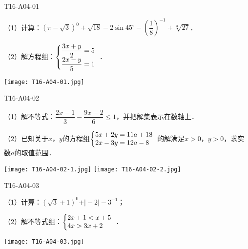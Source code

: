 
\begin{defproblem}{T16-A04-01}%
\begin{onlyproblem}%
（1）计算：$(\pi -\sqrt 3 )^0+\sqrt {18} -2\sin 45^{\circ}-\left(\dfrac{1}{8}\right)^{-1}+\sqrt[3]{27}$．

\renewcommand{\arraystretch}{1.38}
（2）解方程组：$\left\{\begin{array}{@{}l}
 \dfrac{3x+y}{2}=5 \\ 
 \dfrac{2x-y}{5}=1 \\ 
 \end{array}\right.$．
\end{onlyproblem}%
\begin{onlysolution}%
\begin{center}
\texttt{[image: T16-A04-01.jpg]}
\end{center}
\end{onlysolution}%
\end{defproblem}


\begin{defproblem}{T16-A04-02}%
\begin{onlyproblem}%

（1）解不等式：$\dfrac{2x-1}{3}-\dfrac{9x-2}{6}\le 1$，并把解集表示在数轴上．


（2）已知关于$x$，$y$的方程组$\left\{\begin{array}{@{}l}
 5x+2y=11a+18 \\ 
 2x-3y=12a-8 \\ 
 \end{array}\right.$的解满足$x>0$，$y>0$，求实数$a$的取值范围．

\end{onlyproblem}%
\begin{onlysolution}%
\begin{center}
\texttt{[image: T16-A04-02-1.jpg]}
\texttt{[image: T16-A04-02-2.jpg]}
\end{center}
\end{onlysolution}%
\end{defproblem}


\begin{defproblem}{T16-A04-03}%
\begin{onlyproblem}%
（1）计算：$(\sqrt 3 +1)^0+\vert -2\vert -3^{-1}$；


（2）解不等式组：$\left\{\begin{array}{@{}l}
 2x+1<x+5 \\ 
 4x>3x+2 \\ 
 \end{array}\right.$．
\end{onlyproblem}%
\begin{onlysolution}%
\begin{center}
\texttt{[image: T16-A04-03.jpg]}
\end{center}
\end{onlysolution}%
\end{defproblem}


